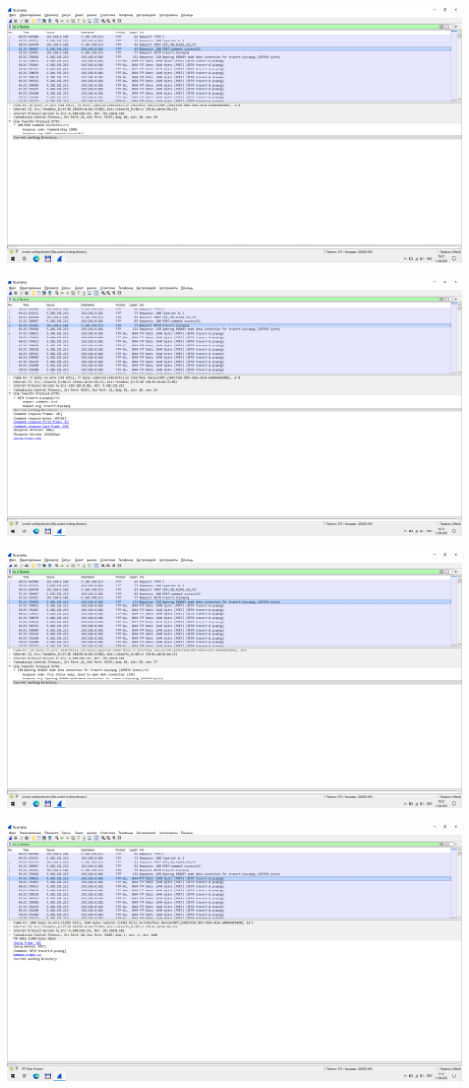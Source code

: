 \begin{center}
    \includegraphics[width=\textwidth]{screenshots/ftp_port_response_1}

    \includegraphics[width=\textwidth]{screenshots/ftp_retr_request_1}

    \includegraphics[width=\textwidth]{screenshots/ftp_retr_response_1}

    \includegraphics[width=\textwidth]{screenshots/ftp_transfer_1}


\end{center}
